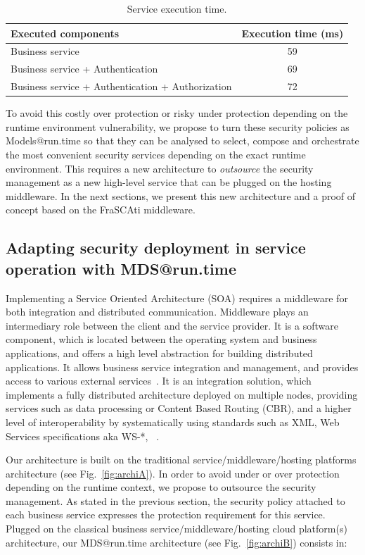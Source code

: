 \documentclass[runningheads,a4paper]{llncs}
\begin{document}
\begin{table}
\caption{Service execution time.}
\begin{tabular}{|p{8cm}|c|}
\hline
Executed components & Execution time (ms)\\
  \hline
 Business service & 59\\
 Business service + Authentication & 69\\ 
 Business service + Authentication + Authorization & 72\\ 
    \hline
\end{tabular}
\label{tab:tab1}
\end{table}

To avoid this costly over protection or risky under protection depending on the runtime environment vulnerability, we propose to turn these security policies as Models@run.time so that they can be analysed to select, compose and orchestrate the most convenient security services depending on the exact runtime environment. This requires a new architecture to \textit{outsource} the security management as a new high-level service that can be plugged on the hosting middleware. In the next sections, we present this new architecture and a proof of concept based on the FraSCAti middleware.

\subsection{Adapting security deployment in service operation with MDS@run.time}

Implementing a Service Oriented Architecture (SOA) requires a middleware for both integration and distributed communication. Middleware plays an intermediary role between the client and the service provider. It is a software component, which is located between the operating system and business applications, and offers a high level abstraction for building distributed applications. It allows business service integration and management, and provides access to various external services~\cite{SHLP05}. It is an integration solution, which implements a fully distributed architecture deployed on multiple nodes, providing services such as data processing or Content Based Routing (CBR), and a higher level of interoperability by systematically using standards such as XML, Web Services specifications aka WS-*, ~\cite{FJF08}.
 
Our architecture is built on the traditional service/middleware/hosting platforms architecture (see Fig.~\ref{fig:archiA}). In order to avoid under or over protection depending on the runtime context, we propose to outsource the security management. As stated in the previous section, the security policy attached to each business service expresses the protection requirement for this service. Plugged on the classical business service/middleware/hosting cloud platform(s) architecture, our MDS@run.time architecture (see Fig.~\ref{fig:archiB}) consists in:
\end{document}
